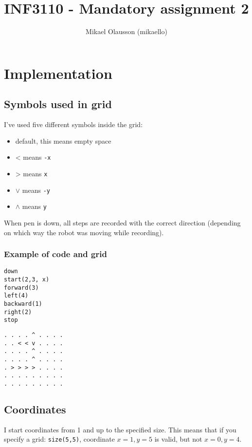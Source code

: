 \documentclass[11pt,english,a4paper]{article}
\title{INF3110 - Mandatory assignment 2}
\author{Mikael Olausson (mikaello)}
\begin{document}
\setcounter{secnumdepth}{-1} %

\maketitle{}

\section{Implementation}

\subsection{Symbols used in grid}
I've used five different symbols inside the grid:
\begin{itemize}
\item[] \textperiodcentered{} \hspace{2 mm} default, this means empty space
\item[] < \hspace{2 mm} means \verb|-x|
\item[] > \hspace{2 mm} means \verb|x|
\item[] $\vee$ \hspace{2 mm} means \verb|-y|
\item[] $\wedge$ \hspace{2 mm} means \verb|y|
\end{itemize}
When pen is down, all steps are recorded with the correct direction
(depending on which way the robot was moving while recording).

\subsubsection{Example of code and grid}

\begin{verbatim}
down
start(2,3, x)
forward(3)
left(4)
backward(1)
right(2)
stop
\end{verbatim}

\begin{verbatim}
. . . . ^ . . . .
. . < < v . . . .
. . . . ^ . . . .
. . . . ^ . . . .
. > > > > . . . .
. . . . . . . . .
. . . . . . . . .
\end{verbatim}

\subsection{Coordinates }
I start coordinates from 1 and up to the specified size. This means
that if you specify a grid: \verb=size(5,5)=, coordinate $x=1,y=5$ is
valid, but not $x=0,y=4$.
\end{document}
